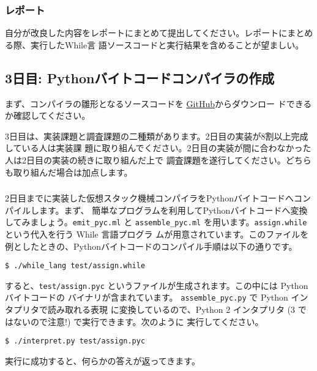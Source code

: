 \documentclass[a4paper,11pt]{jsarticle}
\begin{document}
\subsubsection{レポート}

自分が改良した内容をレポートにまとめて提出してください。レポートにまとめる際、実行したWhile言
語ソースコードと実行結果を含めることが望ましい。


\subsection{3日目: Pythonバイトコードコンパイラの作成}

まず、コンパイラの雛形となるソースコードを
\href{https://github.com/tmu-compiler-info-sys-exp-I/compiler-day3}{GitHub}からダウンロー
ドできるか確認してください。

3日目は、実装課題と調査課題の二種類があります。2日目の実装が8割以上完成している人は実装課
題に取り組んでください。2日目の実装が間に合わなかった人は2日目の実装の続きに取り組んだ上で
調査課題を遂行してください。どちらも取り組んだ場合は加点します。

\subsubsection{}

2日目までに実装した仮想スタック機械コンパイラをPythonバイトコードへコンパイルします。まず、
簡単なプログラムを利用してPythonバイトコードへ変換してみましょう。\verb|emit_pyc.ml| と
\verb|assemble_pyc.ml| を用います。\verb|assign.while| という代入を行う While 言語プログラ
ムが用意されています。このファイルを例としたときの、Pythonバイトコードのコンパイル手順は以下の通りです。

\begin{lstlisting}
$ ./while_lang test/assign.while
\end{lstlisting}

すると、\verb|test/assign.pyc| というファイルが生成されます。この中には Pythonバイトコードの
バイナリが含まれています。 \verb|assemble_pyc.py| で Python インタプリタで読み取れる表現
に変換しているので、Python 2 インタプリタ (3 ではないので注意!) で実行できます。次のように
実行してください。

\begin{lstlisting}
$ ./interpret.py test/assign.pyc
\end{lstlisting}

実行に成功すると、何らかの答えが返ってきます。
\end{document}
